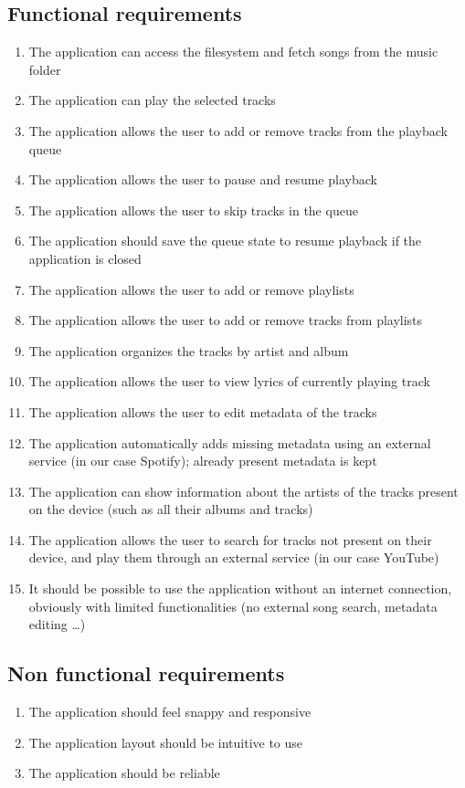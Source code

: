 \documentclass{article}
\begin{document}
\subsection{Functional requirements}
\begin{enumerate}
    \item The application can access the filesystem and fetch songs from the
        music folder
    \item The application can play the selected tracks
    \item The application allows the user to add or remove tracks from the
        playback queue
    \item The application allows the user to pause and resume playback
    \item The application allows the user to skip tracks in the queue
    \item The application should save the queue state to resume playback if the
        application is closed
    \item The application allows the user to add or remove playlists
    \item The application allows the user to add or remove tracks from playlists
    \item The application organizes the tracks by artist and album
    \item The application allows the user to view lyrics of currently playing 
        track
    \item The application allows the user to edit metadata of the tracks
    \item The application automatically adds missing metadata using an external
        service (in our case Spotify); already present metadata is kept
    \item The application can show information about the artists of the tracks
        present on the device (such as all their albums and tracks)
    \item The application allows the user to search for tracks not present on
        their device, and play them through an external service (in our case
        YouTube)
    \item It should be possible to use the application without an internet
        connection, obviously with limited functionalities (no external song
        search, metadata editing \ldots)
\end{enumerate}

\subsection{Non functional requirements}
\begin{enumerate}
    \item The application should feel snappy and responsive
    \item The application layout should be intuitive to use
    \item The application should be reliable
\end{enumerate}
\newpage
\end{document}
